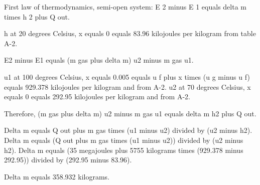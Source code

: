 First law of thermodynamics, semi-open system:  
E 2 minus E 1 equals delta m times h 2 plus Q out.  

h at 20 degrees Celsius, x equals 0 equals 83.96 kilojoules per kilogram from table A-2.

E2 minus E1 equals (m gas plus delta m) u2 minus m gas u1.  

u1 at 100 degrees Celsius, x equals 0.005 equals u f plus x times (u g minus u f) equals 929.378 kilojoules per kilogram and from A-2.  
u2 at 70 degrees Celsius, x equals 0 equals 292.95 kilojoules per kilogram and from A-2.  

Therefore, (m gas plus delta m) u2 minus m gas u1 equals delta m h2 plus Q out.  

Delta m equals Q out plus m gas times (u1 minus u2) divided by (u2 minus h2).  
Delta m equals (Q out plus m gas times (u1 minus u2)) divided by (u2 minus h2).  
Delta m equals (35 megajoules plus 5755 kilograms times (929.378 minus 292.95)) divided by (292.95 minus 83.96).  

Delta m equals 358.932 kilograms.